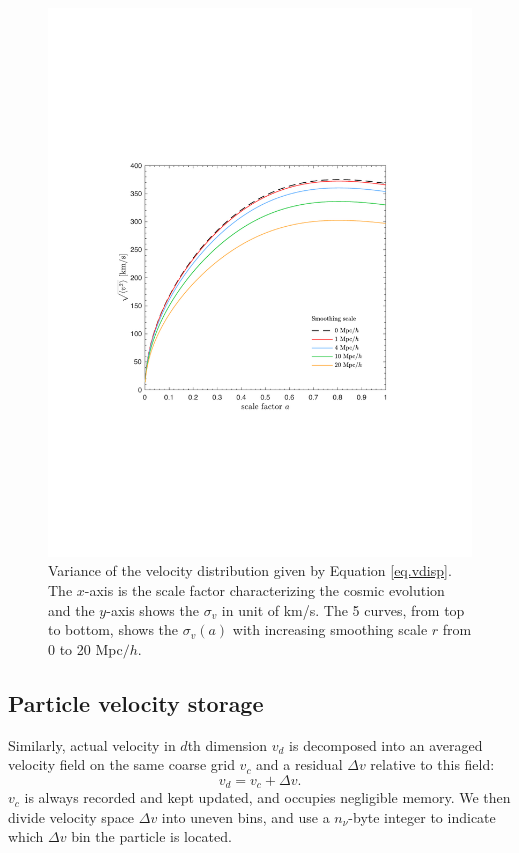 \documentclass[10pt,twocolumn,preprint]{emulateapj}
\begin{document}
\begin{figure}
\centering
  \includegraphics[width=0.88\linewidth]{vdisp.pdf}
 \caption{Variance of the velocity distribution given by Equation \ref{eq.vdisp}. The $x$-axis is the scale factor characterizing the cosmic evolution and the $y$-axis shows the $\sigma_v$ in unit of km/s. The 5 curves, from top to bottom, shows the $\sigma_v(a)$ with increasing smoothing scale $r$ from 0 to 20 Mpc$/h$.}
\label{fig.vdisp}
\end{figure}

\subsection{Particle velocity storage}\label{ss.velocity}
Similarly, actual velocity in $d$th dimension $v_d$ is decomposed into an averaged velocity field on the same coarse grid $v_c$ and a residual $\Delta v$ relative to this field: 
\begin{equation}
	v_d=v_c+\Delta v.
\end{equation}
$v_c$ is always recorded and kept updated, and occupies negligible memory. We then divide velocity space $\Delta v$ into uneven bins, and use a $n_\nu$-byte integer to indicate which $\Delta v$ bin the particle is located.
\end{document}
